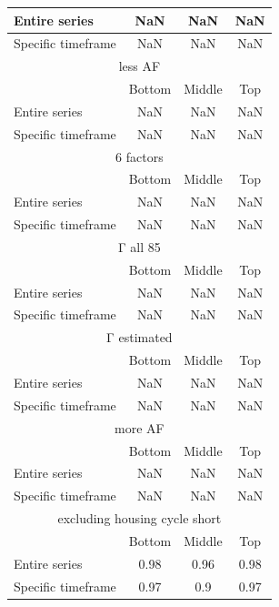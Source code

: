\begin{table}[h!]
\begin{tabular}{|l|c|c|c|}
Entire series & NaN & NaN & NaN \\ \hline
Specific timeframe & NaN & NaN & NaN \\ \hline
\multicolumn{4}{|c|}{less AF} \\ \hline
& Bottom & Middle & Top \\ \hline
Entire series & NaN & NaN & NaN \\ \hline
Specific timeframe & NaN & NaN & NaN \\ \hline
\multicolumn{4}{|c|}{6 factors} \\ \hline
& Bottom & Middle & Top \\ \hline
Entire series & NaN & NaN & NaN \\ \hline
Specific timeframe & NaN & NaN & NaN \\ \hline
\multicolumn{4}{|c|}{Γ all 85} \\ \hline
& Bottom & Middle & Top \\ \hline
Entire series & NaN & NaN & NaN \\ \hline
Specific timeframe & NaN & NaN & NaN \\ \hline
\multicolumn{4}{|c|}{Γ estimated} \\ \hline
& Bottom & Middle & Top \\ \hline
Entire series & NaN & NaN & NaN \\ \hline
Specific timeframe & NaN & NaN & NaN \\ \hline
\multicolumn{4}{|c|}{more AF} \\ \hline
& Bottom & Middle & Top \\ \hline
Entire series & NaN & NaN & NaN \\ \hline
Specific timeframe & NaN & NaN & NaN \\ \hline
\multicolumn{4}{|c|}{excluding housing cycle short} \\ \hline
& Bottom & Middle & Top \\ \hline
Entire series & 0.98 & 0.96 & 0.98 \\ \hline
Specific timeframe & 0.97 & 0.9 & 0.97 \\ \hline
\end{tabular}
\end{table}
